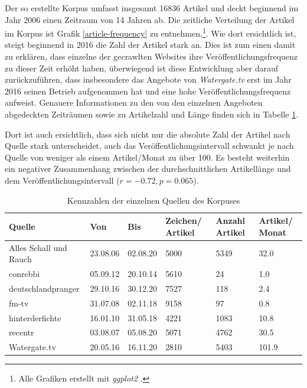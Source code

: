 Der so erstellte Korpus umfasst insgesamt 16836 Artikel und deckt beginnend im Jahr 2006 einen Zeitraum von 14 Jahren ab.
Die zeitliche Verteilung der Artikel im Korpus ist Grafik \ref{article-frequency}
zu entnehmen,\footnote{Alle Grafiken erstellt mit \textit{ggplot2} \parencite{ggplot2}.}.
Wie dort ersichtlich ist, steigt beginnend in 2016 die Zahl der Artikel stark an.
Dies ist zum einen damit zu erklären, dass einzelne der gecrawlten Websites ihre Veröffentlichungsfrequenz zu dieser Zeit erhöht haben, überwiegend ist diese Entwicklung aber darauf zurückzuführen, dass insbesondere das Angebote von \textit{Watergate.tv} erst im Jahr 2016 seinen Betrieb aufgenommen hat und eine hohe Veröffentlichungsfrequenz aufweist.
Genauere Informationen zu den von den einzelnen Angeboten abgedeckten Zeiträumen sowie zu Artikelzahl und Länge finden sich in Tabelle \ref{corpus-stats}.

Dort ist auch ersichtlich, dass sich nicht nur die absolute Zahl der Artikel nach Quelle stark unterscheidet, auch das Veröffentlichungsintervall schwankt je nach Quelle von weniger als einem Artikel/Monat zu über 100.
Es besteht weiterhin ein negativer Zusammenhang zwischen der durchschnittlichen Artikellänge und dem Veröffentlichungsintervall ($r = -0.72, p = 0.065$).

\begin{table}
    \begin{center}
        \begin{tabularx}{\textwidth}{lXXXXX}
            \toprule
            Quelle & Von & Bis & Zeichen/ Artikel & Anzahl Artikel & Artikel/ Monat\\
            \midrule
            Alles Schall und Rauch & 23.08.06 & 02.08.20 & 5000 & 5349 & 32.0\\
            conrebbi & 05.09.12 & 20.10.14 & 5610 & 24 & 1.0\\
            deutschlandpranger & 29.10.16 & 30.12.20 & 7527 & 118 & 2.4\\
            fm-tv & 31.07.08 & 02.11.18 & 9158 & 97 & 0.8\\
            hinterderfichte & 16.01.10 & 31.05.18 & 4221 & 1083 & 10.8\\
            recentr & 03.08.07 & 05.08.20 & 5071 & 4762 & 30.5\\
            Watergate.tv & 20.05.16 & 16.11.20 & 2810 & 5403 & 101.9\\
            \bottomrule
            \end{tabularx}
        \caption{Kennzahlen der einzelnen Quellen des Korpuses}
        \label{corpus-stats}
    \end{center}
\end{table}



